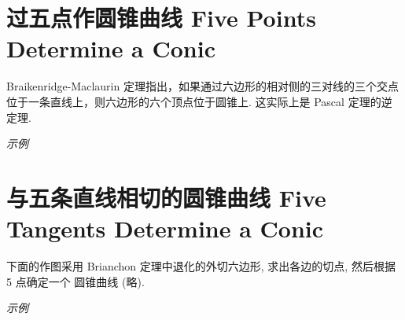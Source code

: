 \section{过五点作圆锥曲线 Five Points Determine a Conic}

Braikenridge-Maclaurin 定理指出，如果通过六边形的相对侧的三对线的三个交点位于一条直线上，则六边形的六个顶点位于圆锥上. 这实际上是 Pascal 定理的逆定理.

\emph{示例}


\section{与五条直线相切的圆锥曲线 Five Tangents Determine a Conic}

下面的作图采用 Brianchon 定理中退化的外切六边形, 求出各边的切点, 然后根据 5 点确定一个
圆锥曲线 (略).

\emph{示例}





